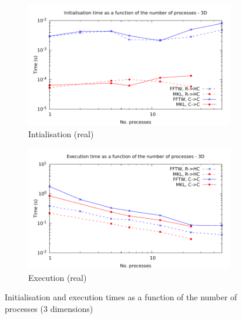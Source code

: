 \documentclass[12pt, a4paper]{article}
\begin{document}
\begin{figure}[H]
\captionsetup{width=0.8\linewidth}
\centering
\begin{subfigure}{.5\textwidth}
\centering
\includegraphics[width=.9\linewidth]{graphs/mpi-init-3d.pdf}
\caption{Intialisation (real)}
\label{3DMPII}
\end{subfigure}%
\begin{subfigure}{.5\textwidth}
\centering
\includegraphics[width=.9\linewidth]{graphs/mpi-exec-3d.pdf}
\caption{Execution (real)}
\label{3DMPIE}
\end{subfigure}
\caption{Initialisation and execution times as a function of the number of processes (3 dimensions)}
\label{3DMPI}
\end{figure}
\end{document}
